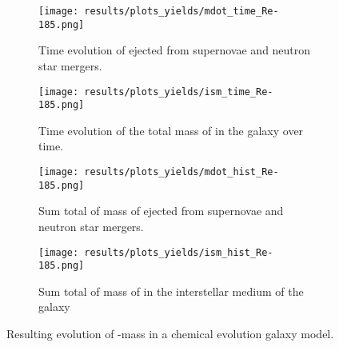 \begin{figure}
  \begin{subfigure}{\subfigwidth}
    \centering
    \texttt{[image: results/plots\_yields/mdot\_time\_Re-185.png]}
    \caption{Time evolution of  ejected from supernovae and neutron star mergers.}
  \end{subfigure}
  \begin{subfigure}{\subfigwidth}
    \centering
    \texttt{[image: results/plots\_yields/ism\_time\_Re-185.png]}
    \caption{Time evolution of the total mass of  in the galaxy over time.}
  \end{subfigure}
  \begin{subfigure}{\subfigwidth}
    \centering
    \texttt{[image: results/plots\_yields/mdot\_hist\_Re-185.png]}
    \caption{Sum total of mass of  ejected from supernovae and neutron star mergers.}
  \end{subfigure}
  \begin{subfigure}{\subfigwidth}
    \centering
    \texttt{[image: results/plots\_yields/ism\_hist\_Re-185.png]}
    \caption{Sum total of mass of  in the interstellar medium of the galaxy}
  \end{subfigure}
  \caption{Resulting evolution of -mass in a chemical evolution galaxy model.}
\end{figure}
\begin{table}
  
\end{table}

